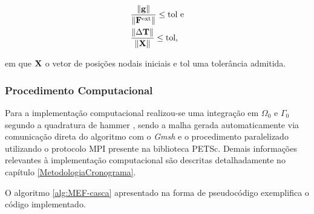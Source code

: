 \documentclass[_ArquivoPrincipal.tex]{subfiles}
\begin{document}
\begin{subequations}
    \begin{align}
         & \frac{\left\lVert{\mathbf{g}}\right\lVert}{\left\lVert{\mathbf{F}^\text{ext}}\right\lVert}\leq\text{tol e} \\
         & \frac{\left\lVert{\Delta\mathbf{T}}\right\lVert}{\left\lVert{\mathbf{X}}\right\lVert}\leq\text{tol,}
    \end{align}
    \label{eq:CSD-erro}
\end{subequations}

\noindent em que $\mathbf{X}$ o vetor de posições nodais iniciais e tol uma tolerância admitida.

\subsubsection{Procedimento Computacional} \label{MEFP-Comp}

Para a implementação computacional realizou-se uma integração em $\Omega_0$ e $\Gamma_0$ segundo a quadratura de hammer \cite{hammer1956numerical}, sendo a malha gerada automaticamente via comunicação direta do algoritmo com o \textit{Gmsh} e o procedimento paralelizado utilizando o protocolo MPI presente na biblioteca PETSc. Demais informações relevantes à implementação computacional são descritas detalhadamente no capítulo \ref{MetodologiaCronograma}.

O algoritmo \ref{alg:MEF-casca} apresentado na forma de pseudocódigo exemplifica o código implementado.
\end{document}
